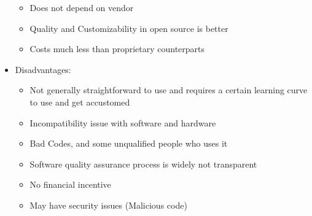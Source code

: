 \documentclass[12pt,openany]{book}
\begin{document}
\begin{itemize}
\begin{itemize}
\begin{itemize}
        \end{itemize}
        \item Does not depend on vendor
        \item Quality and Customizability in open source is better
        \item Costs much less than proprietary counterparts
    \end{itemize}
    \item Disadvantages:
    \begin{itemize}
        \item Not generally straightforward to use and requires a certain learning curve to use and get accustomed
        \item Incompatibility issue with software and hardware
        \item Bad Codes, and some unqualified people who uses it
        \item Software quality assurance process is widely not transparent
        \item No financial incentive
        \item May have security issues (Malicious code)
    \end{itemize}
\end{itemize}
\end{document}
